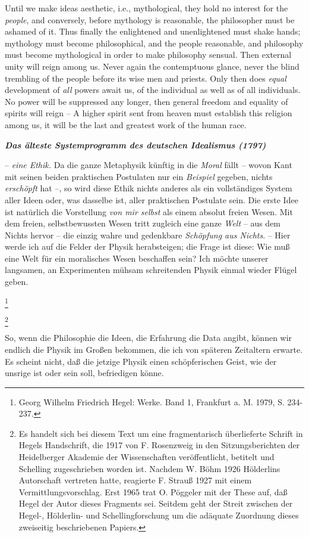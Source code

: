 \documentclass[12pt,letterpaper]{article} %
\newcommand{\mytitle}[1]{%
\newpage
\begin{center}
{\LARGE \textbf{\textit{#1}} \par}
\end{center}
\vskip 10pt
}
\newcommand\blfootnote[1]{%
  \begingroup
  \renewcommand\thefootnote{}\footnote{#1}%
  \addtocounter{footnote}{-1}%
  \endgroup
}
\begin{document}
Until we make ideas aesthetic, i.e., mythological, they hold no interest for the \textit{people},
and conversely, before mythology is reasonable, the philosopher must be ashamed of it. Thus
finally the enlightened and unenlightened must shake hands; mythology must become
philosophical, and the people reasonable, and philosophy must become mythological in order
to make philosophy sensual. Then external unity will reign among us. Never again the
contemptuous glance, never the blind trembling of the people before its wise men and priests.
Only then does \textit{equal} development of \textit{all} powers await us, of the individual as well as of all
individuals. No power will be suppressed any longer, then general freedom and equality of
spirits will reign -- A higher spirit sent from heaven must establish this religion among us, it
will be the last and greatest work of the human race.


\newpage %


\mytitle{\textbf{\textit{\large Das älteste Systemprogramm des deutschen Idealismus (1797)}}}


– \textit{eine Ethik.} Da die ganze Metaphysik künftig in die \textit{Moral} fällt – wovon Kant mit seinen beiden praktischen Postulaten nur ein \textit{Beispiel} gegeben, nichts \textit{erschöpft} hat –, so wird diese Ethik nichts anderes als ein vollständiges System aller Ideen oder, was dasselbe ist, aller praktischen Postulate sein. Die erste Idee ist natürlich die Vorstellung \textit{von mir selbst} als einem absolut freien Wesen. Mit dem freien, selbstbewussten Wesen tritt zugleich eine ganze \textit{Welt} – aus dem Nichts hervor – die einzig wahre und gedenkbare \textit{Schöpfung aus Nichts}. – Hier werde ich auf die Felder der Physik herabsteigen; die Frage ist diese: Wie muß eine Welt für ein moralisches Wesen beschaffen sein? Ich möchte unserer langsamen, an Experimenten mühsam schreitenden Physik einmal wieder Flügel geben.

\blfootnote{Georg Wilhelm Friedrich Hegel: Werke. Band 1, Frankfurt a. M. 1979, S. 234-237.}
\blfootnote{Es handelt sich bei diesem Text um eine fragmentarisch überlieferte Schrift in Hegels Handschrift, die 1917 von F. Rosenzweig in den Sitzungsberichten der Heidelberger Akademie der Wissenschaften veröffentlicht, betitelt und Schelling zugeschrieben worden ist. Nachdem W. Böhm 1926 Hölderlins Autorschaft vertreten hatte, reagierte F. Strauß 1927 mit einem Vermittlungsvorschlag. Erst 1965 trat O. Pöggeler mit der These auf, daß Hegel der Autor dieses Fragments sei. Seitdem geht der Streit zwischen der Hegel-, Hölderlin- und Schellingforschung um die adäquate Zuordnung dieses zweiseitig beschriebenen Papiers.
}
So, wenn die Philosophie die Ideen, die Erfahrung die Data angibt, können wir endlich die Physik im Großen bekommen, die ich von späteren Zeitaltern erwarte. Es scheint nicht, daß die jetzige Physik einen schöpferischen Geist, wie der unsrige ist oder sein soll, befriedigen könne.
\end{document}
